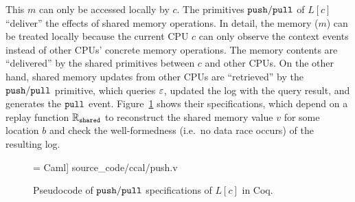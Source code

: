 This $m$ can only be accessed locally by $c$. The primitives ${\mathrm{\texttt{push}}}/{\mathrm{\texttt{pull}}}$ of
$L[c]$  ``deliver'' the effects of shared memory operations.
In detail, the memory ($m$) can be treated locally
because the current CPU $c$ can only observe 
the context events instead of other CPUs'  concrete memory
operations. The memory contents are ``delivered''  by the  shared primitives
between $c$ and other CPUs.
On the other hand, 
shared memory updates from other CPUs are ``retrieved'' by the ${\mathrm{\texttt{push}}}/{\mathrm{\texttt{pull}}}$ primitive, 
which  queries $\oracle$, updated the log
with the query result, and generates the ${\mathrm{\texttt{pull}}}$ event.
Figure~\ref{fig:exp:pull} shows their specifications, which depend on
a replay function  $\mathbb{R}_{{\mathrm{\texttt{shared}}}}$ to
reconstruct the shared memory value $v$ for some location $b$ and check the well-formedness (i.e.\, no data race occurs)
of the resulting log.







\begin{figure}[t]
 = Caml] {source_code/ccal/push.v}
\caption{Pseudocode of ${\mathrm{\texttt{push}}}/{\mathrm{\texttt{pull}}}$ specifications of $L[c]$ in Coq.}
\label{fig:exp:pull}
\end{figure}

